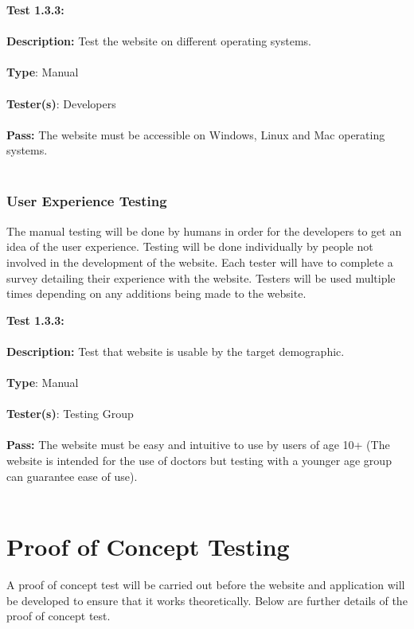 \documentclass[12pt]{article}
\begin{document}
\begin{tcolorbox}
\textbf{Test 1.3.3:} \\ \\
\textbf{Description:} Test the website on different operating systems. \\ \\
\textbf{Type}: Manual \\ \\
\textbf{Tester(s)}: Developers \\ \\
\textbf{Pass:} The website must be accessible on Windows, Linux and Mac operating systems. \\ \\
\end{tcolorbox}



\subsubsection{User Experience Testing}
The manual testing will be done by humans in order for the developers to get an idea of the user experience. Testing will be done individually by people not involved in the development of the website. Each tester will have to complete a survey detailing their experience with the website. Testers will be used multiple times depending on any additions being made to the website.

\begin{tcolorbox}
\textbf{Test 1.3.3:} \\ \\
\textbf{Description:} Test that website is usable by the target demographic. \\ \\
\textbf{Type}: Manual \\ \\
\textbf{Tester(s)}: Testing Group \\ \\
\textbf{Pass:} The website must be easy and intuitive to use by users of age 10+ (The website is intended for the use of doctors but testing with a younger age group can guarantee ease of use). \\ \\
\end{tcolorbox}

\section{Proof of Concept Testing}
A proof of concept test will be carried out before the website and application will be developed to ensure that it works theoretically. Below are further details of the proof of concept test.
\end{document}
